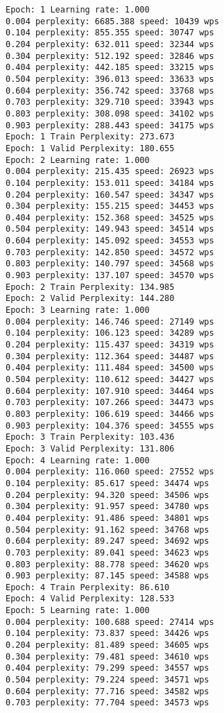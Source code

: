 \documentclass[11pt]{article}
\begin{document}
    \begin{Verbatim}[commandchars=\\\{\}]
Epoch: 1 Learning rate: 1.000
0.004 perplexity: 6685.388 speed: 10439 wps
0.104 perplexity: 855.355 speed: 30747 wps
0.204 perplexity: 632.011 speed: 32344 wps
0.304 perplexity: 512.192 speed: 32846 wps
0.404 perplexity: 442.185 speed: 33215 wps
0.504 perplexity: 396.013 speed: 33633 wps
0.604 perplexity: 356.742 speed: 33768 wps
0.703 perplexity: 329.710 speed: 33943 wps
0.803 perplexity: 308.098 speed: 34102 wps
0.903 perplexity: 288.443 speed: 34175 wps
Epoch: 1 Train Perplexity: 273.673
Epoch: 1 Valid Perplexity: 180.655
Epoch: 2 Learning rate: 1.000
0.004 perplexity: 215.435 speed: 26923 wps
0.104 perplexity: 153.011 speed: 34184 wps
0.204 perplexity: 160.547 speed: 34347 wps
0.304 perplexity: 155.215 speed: 34453 wps
0.404 perplexity: 152.368 speed: 34525 wps
0.504 perplexity: 149.943 speed: 34514 wps
0.604 perplexity: 145.092 speed: 34553 wps
0.703 perplexity: 142.850 speed: 34572 wps
0.803 perplexity: 140.797 speed: 34568 wps
0.903 perplexity: 137.107 speed: 34570 wps
Epoch: 2 Train Perplexity: 134.985
Epoch: 2 Valid Perplexity: 144.280
Epoch: 3 Learning rate: 1.000
0.004 perplexity: 146.746 speed: 27149 wps
0.104 perplexity: 106.123 speed: 34289 wps
0.204 perplexity: 115.437 speed: 34319 wps
0.304 perplexity: 112.364 speed: 34487 wps
0.404 perplexity: 111.484 speed: 34500 wps
0.504 perplexity: 110.612 speed: 34427 wps
0.604 perplexity: 107.910 speed: 34464 wps
0.703 perplexity: 107.266 speed: 34473 wps
0.803 perplexity: 106.619 speed: 34466 wps
0.903 perplexity: 104.376 speed: 34555 wps
Epoch: 3 Train Perplexity: 103.436
Epoch: 3 Valid Perplexity: 131.806
Epoch: 4 Learning rate: 1.000
0.004 perplexity: 116.060 speed: 27552 wps
0.104 perplexity: 85.617 speed: 34474 wps
0.204 perplexity: 94.320 speed: 34506 wps
0.304 perplexity: 91.957 speed: 34780 wps
0.404 perplexity: 91.486 speed: 34801 wps
0.504 perplexity: 91.162 speed: 34768 wps
0.604 perplexity: 89.247 speed: 34692 wps
0.703 perplexity: 89.041 speed: 34623 wps
0.803 perplexity: 88.778 speed: 34620 wps
0.903 perplexity: 87.145 speed: 34588 wps
Epoch: 4 Train Perplexity: 86.610
Epoch: 4 Valid Perplexity: 128.533
Epoch: 5 Learning rate: 1.000
0.004 perplexity: 100.688 speed: 27414 wps
0.104 perplexity: 73.837 speed: 34426 wps
0.204 perplexity: 81.489 speed: 34605 wps
0.304 perplexity: 79.481 speed: 34610 wps
0.404 perplexity: 79.299 speed: 34557 wps
0.504 perplexity: 79.224 speed: 34571 wps
0.604 perplexity: 77.716 speed: 34582 wps
0.703 perplexity: 77.704 speed: 34573 wps

\end{Verbatim}
\end{document}
